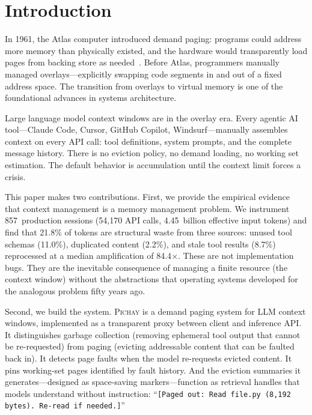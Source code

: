 \section{Introduction}
\label{sec:intro}

In 1961, the Atlas computer introduced demand paging: programs could
address more memory than physically existed, and the hardware would
transparently load pages from backing store as
needed~\citep{kilburn1962one}. Before Atlas, programmers manually
managed overlays---explicitly swapping code segments in and out of a
fixed address space. The transition from overlays to virtual memory
is one of the foundational advances in systems architecture.

Large language model context windows are in the overlay era. Every
agentic AI tool---Claude Code, Cursor, GitHub Copilot,
Windsurf---manually assembles context on every API call: tool
definitions, system prompts, and the complete message history. There
is no eviction policy, no demand loading, no working set estimation.
The default behavior is accumulation until the context limit forces
a crisis.

This paper makes two contributions. First, we provide the empirical
evidence that context management is a memory management problem. We
instrument 857~production sessions (54{,}170 API calls,
4.45~billion effective input tokens) and find that 21.8\% of tokens
are structural waste from three sources: unused tool schemas
(11.0\%), duplicated content (2.2\%), and stale tool results (8.7\%)
reprocessed at a median amplification of 84.4$\times$. These are
not implementation bugs. They are the inevitable consequence of
managing a finite resource (the context window) without the
abstractions that operating systems developed for the analogous
problem fifty years ago.

Second, we build the system. \textsc{Pichay} is a demand paging
system for LLM context windows, implemented as a transparent proxy
between client and inference API. It distinguishes garbage collection
(removing ephemeral tool output that cannot be re-requested) from
paging (evicting addressable content that can be faulted back in).
It detects page faults when the model re-requests evicted content.
It pins working-set pages identified by fault history. And the
eviction summaries it generates---designed as space-saving
markers---function as retrieval handles that models understand
without instruction: ``\texttt{[Paged out: Read file.py (8,192
bytes). Re-read if needed.]}''

